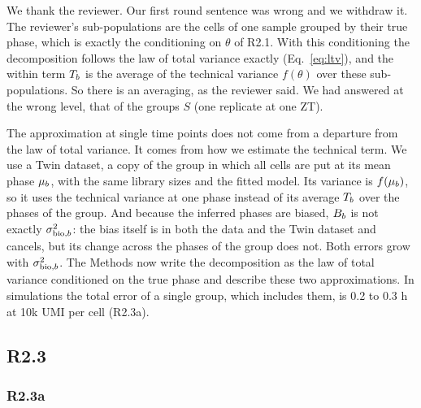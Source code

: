 \response
We thank the reviewer. Our first round sentence was wrong and we withdraw it. The reviewer's sub-populations are the cells of one sample grouped by their true phase, which is exactly the conditioning on $\theta$ of R2.1. With this conditioning the decomposition follows the law of total variance exactly (Eq.~\eqref{eq:ltv}), and the within term $T_b$ is the average of the technical variance $f(\theta)$ over these sub-populations. So there is an averaging, as the reviewer said. We had answered at the wrong level, that of the groups $S$ (one replicate at one ZT).

The approximation at single time points does not come from a departure from the law of total variance. It comes from how we estimate the technical term. We use a Twin dataset, a copy of the group in which all cells are put at its mean phase $\mu_b$, with the same library sizes and the fitted model. Its variance is $f(\mu_b)$, so it uses the technical variance at one phase instead of its average $T_b$ over the phases of the group. And because the inferred phases are biased, $B_b$ is not exactly $\sigma_{\text{bio},b}^2$: the bias itself is in both the data and the Twin dataset and cancels, but its change across the phases of the group does not. Both errors grow with $\sigma_{\text{bio},b}^2$. The Methods now write the decomposition as the law of total variance conditioned on the true phase and describe these two approximations. In simulations the total error of a single group, which includes them, is 0.2 to 0.3 h at 10k UMI per cell (R2.3a).

\subsection*{R2.3}


\subsubsection*{R2.3a}

